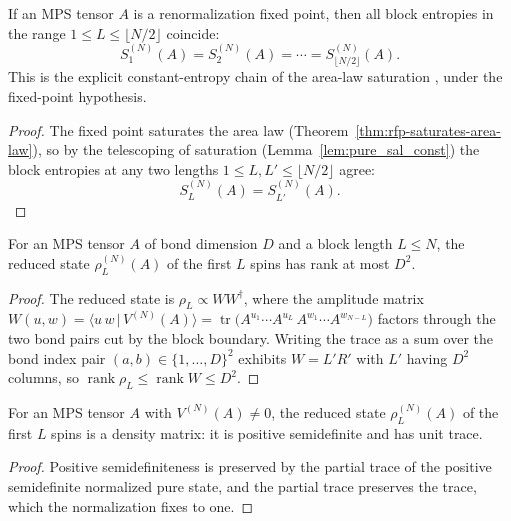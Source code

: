 \begin{theorem}
    \label{thm:rfp_constant_entropy}
    \leanok
    If an MPS tensor $A$ is a renormalization fixed point, then all block entropies
    in the range $1\le L\le\lfloor N/2\rfloor$ coincide:
    \[
        S_1^{(N)}(A) = S_2^{(N)}(A) = \cdots = S_{\lfloor N/2\rfloor}^{(N)}(A).
    \]
    This is the explicit constant-entropy chain of the area-law saturation
    \cite[Definition~3.13, line~600]{Cirac2016MPDO_arXiv}, under the fixed-point
    hypothesis.
\end{theorem}
\begin{proof}\leanok
    The fixed point saturates the area law
    (Theorem~\ref{thm:rfp-saturates-area-law}), so by the telescoping of
    saturation (Lemma~\ref{lem:pure_sal_const}) the block entropies at any two
    lengths $1\le L, L'\le\lfloor N/2\rfloor$ agree:
    \[
        S_L^{(N)}(A) = S_{L'}^{(N)}(A).
    \]
\end{proof}

\begin{lemma}\label{lem:operator_schmidt_rank}
    \leanok
    For an MPS tensor $A$ of bond dimension $D$ and a block length $L\le N$, the
    reduced state $\rho_L^{(N)}(A)$ of the first $L$ spins has rank at most $D^2$.
\end{lemma}
\begin{proof}\leanok
    The reduced state is $\rho_L \propto W W^\dagger$, where the amplitude matrix
    $W(u, w) = \langle u\,w\,|\,V^{(N)}(A)\rangle = \operatorname{tr}
        \bigl(A^{u_1}\cdots A^{u_L}\, A^{w_1}\cdots A^{w_{N-L}}\bigr)$ factors through
    the two bond pairs cut by the block boundary. Writing the trace as a sum over
    the bond index pair $(a, b)\in\{1,\dots,D\}^2$ exhibits $W = L'R'$ with $L'$
    having $D^2$ columns, so $\operatorname{rank}\rho_L \le \operatorname{rank} W
        \le D^2$.
\end{proof}

\begin{lemma}
    \label{lem:reduced_pure_block_state_density}
    \leanok
    For an MPS tensor $A$ with $V^{(N)}(A)\neq 0$, the reduced state $\rho_L^{(N)}(A)$ of
    the first $L$ spins is a density matrix: it is positive semidefinite and has unit
    trace.
\end{lemma}
\begin{proof}\leanok
    Positive semidefiniteness is preserved by the partial trace of the positive
    semidefinite normalized pure state, and the partial trace preserves the trace, which
    the normalization fixes to one.
\end{proof}

